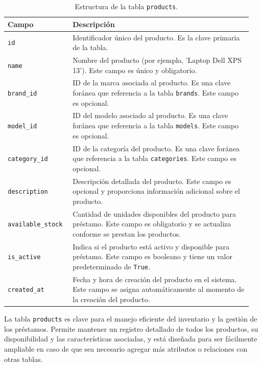 \begin{table}[H]
  \centering
  \begin{tabular}{|p{0.25\linewidth}|p{0.7\linewidth}|}
    \hline
    \textbf{Campo} & \textbf{Descripción} \\
    \hline
    \texttt{id} & Identificador único del producto. Es la clave primaria de la tabla. \\
    \hline
    \texttt{name} & Nombre del producto (por ejemplo, 'Laptop Dell XPS 13'). Este campo es único y obligatorio. \\
    \hline
    \texttt{brand\_id} & ID de la marca asociada al producto. Es una clave foránea que referencia a la tabla \texttt{brands}. Este campo es opcional. \\
    \hline
    \texttt{model\_id} & ID del modelo asociado al producto. Es una clave foránea que referencia a la tabla \texttt{models}. Este campo es opcional. \\
    \hline
    \texttt{category\_id} & ID de la categoría del producto. Es una clave foránea que referencia a la tabla \texttt{categories}. Este campo es opcional. \\
    \hline
    \texttt{description} & Descripción detallada del producto. Este campo es opcional y proporciona información adicional sobre el producto. \\
    \hline
    \texttt{available\_stock} & Cantidad de unidades disponibles del producto para préstamo. Este campo es obligatorio y se actualiza conforme se prestan los productos. \\
    \hline
    \texttt{is\_active} & Indica si el producto está activo y disponible para préstamo. Este campo es booleano y tiene un valor predeterminado de \texttt{True}. \\
    \hline
    \texttt{created\_at} & Fecha y hora de creación del producto en el sistema. Este campo se asigna automáticamente al momento de la creación del producto. \\
    \hline
  \end{tabular}
  \caption{Estructura de la tabla \texttt{products}.}
  \label{tab:tabla_products}
\end{table}

La tabla \texttt{products} es clave para el manejo eficiente del inventario y la gestión de los préstamos. Permite mantener un registro detallado de todos los productos, su disponibilidad y las características asociadas, y está diseñada para ser fácilmente ampliable en caso de que sea necesario agregar más atributos o relaciones con otras tablas.

